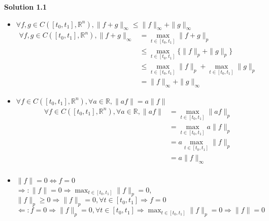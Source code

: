 \documentclass[fleqn, 10.5pt, a4paper]{article}
\def\R{{\mathbb R}}
\theoremstyle{definition}
\numberwithin{equation}{section}
\begin{document}
\noindent \textbf {Solution 1.1} \\
\begin{itemize}
	\item $\forall f, g \in C([t_0, t_1], \R^n), \|f+g\|_\infty \leq \|f\|_\infty + \|g\|_\infty$
	\begin{align*}
		\forall f, g \in C([t_0, t_1], \R^n), \|f+g\|_\infty &= \max_{t \in [t_0, t_1]} \| f + g\|_p \\
		&\leq  \max_{t \in [t_0, t_1]} \{\| f \|_p + \|g\|_p\} \\
		&\leq \max_{t \in [t_0, t_1]} \| f \|_p + \max_{t \in [t_0, t_1]} \|g\|_p \\
		&= \|f\|_\infty + \|g\|_\infty
	\end{align*}
	\item $\forall f \in C([t_0, t_1], \R^n), \forall a \in \R, \|af\| = a\|f\|$
	\begin{align*}
		\forall f \in C([t_0, t_1], \R^n), \forall a \in \R, \|af\| &= \max_{t \in [t_0, t_1]} \| af \|_p \\
		&= \max_{t \in [t_0, t_1]} a \| f \|_p \\
		&= a \max_{t \in [t_0, t_1]} \| f \|_p \\
		&= a\| f \|_\infty \\
	\end{align*}
	\item $\|f\|=0 \Leftrightarrow f = 0$ \\
	$\Rightarrow: \|f\|=0\Rightarrow\max_{t \in [t_0, t_1]} \| f \|_p = 0$, $\|f\|_p \geq 0 \Rightarrow \|f\|_p = 0, \forall t \in [t_0, t_1] \Rightarrow f = 0$ \\
	$\Leftarrow: f = 0 \Rightarrow \|f\|_p = 0, \forall t \in [t_0, t_1] \Rightarrow \max_{t \in [t_0, t_1]} \| f \|_p = 0 \Rightarrow \|f\|=0$
\end{itemize}
\end{document}
